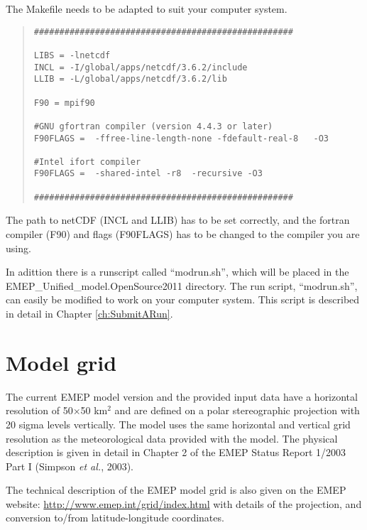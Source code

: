 The Makefile needs to be adapted to suit your computer system.
\begin{quote}
\begin{small}
\begin{verbatim}
###################################################

LIBS = -lnetcdf
INCL = -I/global/apps/netcdf/3.6.2/include
LLIB = -L/global/apps/netcdf/3.6.2/lib

F90 = mpif90

#GNU gfortran compiler (version 4.4.3 or later) 
F90FLAGS =  -ffree-line-length-none -fdefault-real-8   -O3

#Intel ifort compiler
F90FLAGS =  -shared-intel -r8  -recursive -O3

###################################################
\end{verbatim}
\end{small}
\end{quote}

The path to netCDF (INCL and LLIB) has to be set correctly, and the fortran compiler 
(F90) and flags (F90FLAGS) has to be changed to the compiler you are using. 


In adittion there is a runscript called ``modrun.sh'', which will be placed 
in the EMEP\_Unified\_model.OpenSource2011  directory. The run script, 
``modrun.sh'', can easily be modified to work on your computer system. This 
script is described in detail in Chapter \ref{ch:SubmitARun}. 


\section{Model grid}
\label{sec:ModelGrid}

The current EMEP model version and the provided input data
have a horizontal resolution of 50$\times$50 km$^2$ and are defined on a
polar stereographic projection with 20 sigma levels vertically. 
The model uses the same horizontal and vertical grid resolution as the 
meteorological data provided with the model. The physical
description is given in detail in Chapter 2 of the EMEP Status Report
1/2003 Part I (Simpson {\sl et al.}, 2003).

The technical description of the EMEP model grid is also given on the 
EMEP website:
\url{http://www.emep.int/grid/index.html} with details of the projection, and
conversion to/from latitude-longitude coordinates.
